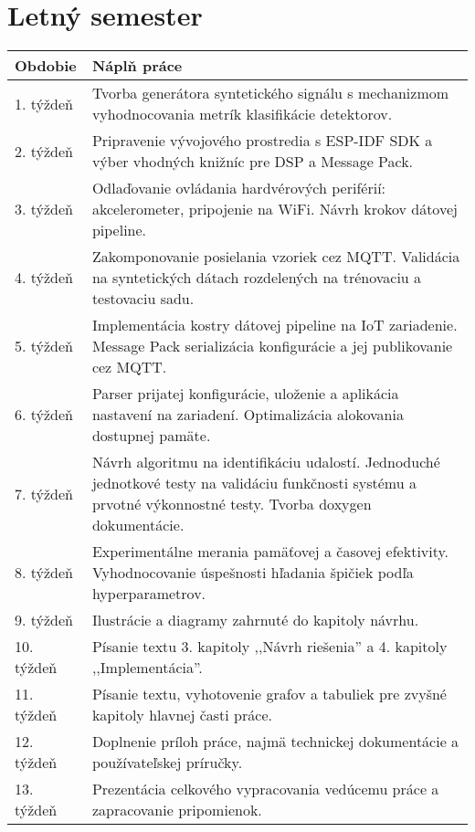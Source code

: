 \section{Letný semester}
\begin{table}[h!]
\def\arraystretch{1.25}
\begin{tabular}{|l|p{12cm}|}
\hline
\textbf{Obdobie} & \textbf{Náplň práce}                                                                                                                                            \\ \hline
1. týždeň        & Tvorba generátora syntetického signálu s mechanizmom vyhodnocovania metrík  klasifikácie detektorov.                                                            \\ \hline
2. týždeň        & Pripravenie vývojového prostredia s ESP-IDF SDK a výber  vhodných knižníc  pre DSP a Message Pack.                                                              \\ \hline
3. týždeň        & Odlaďovanie ovládania hardvérových periférií: akcelerometer, pripojenie na WiFi.  Návrh krokov dátovej pipeline.                                                \\ \hline
4. týždeň        & Zakomponovanie posielania vzoriek cez MQTT. Validácia na syntetických dátach rozdelených na trénovaciu a testovaciu sadu.                                       \\ \hline
5. týždeň        & Implementácia kostry dátovej pipeline na IoT zariadenie. Message Pack serializácia  konfigurácie a jej publikovanie  cez MQTT. \\ \hline
6. týždeň        & Parser prijatej konfigurácie, uloženie a aplikácia nastavení na zariadení.  Optimalizácia alokovania dostupnej pamäte.                                          \\ \hline
7. týždeň        & Návrh algoritmu na identifikáciu udalostí. Jednoduché jednotkové testy na validáciu funkčnosti systému a prvotné výkonnostné testy. Tvorba doxygen dokumentácie. \\ \hline
8. týždeň        & Experimentálne merania pamäťovej a časovej efektivity. Vyhodnocovanie úspešnosti hľadania špičiek podľa hyperparametrov. \\ \hline
9. týždeň        & Ilustrácie a diagramy zahrnuté do kapitoly návrhu. \\ \hline
10. týždeň       & Písanie textu 3. kapitoly ,,Návrh riešenia'' a 4. kapitoly ,,Implementácia''. \\ \hline
11. týždeň       & Písanie textu, vyhotovenie grafov a tabuliek pre zvyšné kapitoly  hlavnej časti práce. \\ \hline
12. týždeň       & Doplnenie príloh práce, najmä technickej dokumentácie a  používateľskej príručky.                                                                                 \\ \hline
13. týždeň       & Prezentácia celkového vypracovania vedúcemu práce a zapracovanie pripomienok.                                                                                                           \\ \hline
\end{tabular}
\end{table}

